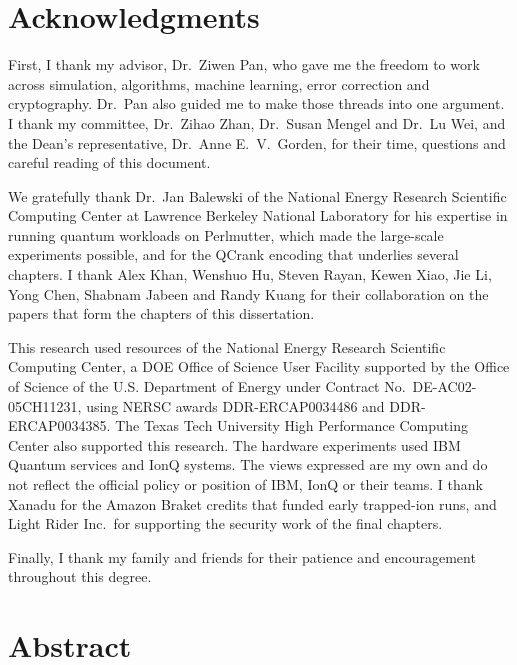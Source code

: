 \documentclass{report}
\theoremstyle{plain}
\theoremstyle{definition}
\theoremstyle{remark}
\begin{document}
\chapter*{Acknowledgments}

First, I thank my advisor, Dr.~Ziwen Pan, who gave me the freedom to work across simulation, algorithms, machine learning, error correction and cryptography. Dr.~Pan also guided me to make those threads into one argument. I thank my committee, Dr.~Zihao Zhan, Dr.~Susan Mengel and Dr.~Lu Wei, and the Dean's representative, Dr.~Anne E.~V.~Gorden, for their time, questions and careful reading of this document.

We gratefully thank Dr.~Jan Balewski of the National Energy Research Scientific Computing Center at Lawrence Berkeley National Laboratory for his expertise in running quantum workloads on Perlmutter, which made the large-scale experiments possible, and for the QCrank encoding that underlies several chapters. I thank Alex Khan, Wenshuo Hu, Steven Rayan, Kewen Xiao, Jie Li, Yong Chen, Shabnam Jabeen and Randy Kuang for their collaboration on the papers that form the chapters of this dissertation.

This research used resources of the National Energy Research Scientific Computing Center, a DOE Office of Science User Facility supported by the Office of Science of the U.S. Department of Energy under Contract No.~DE-AC02-05CH11231, using NERSC awards DDR-ERCAP0034486 and DDR-ERCAP0034385. The Texas Tech University High Performance Computing Center also supported this research. The hardware experiments used IBM Quantum services and IonQ systems. The views expressed are my own and do not reflect the official policy or position of IBM, IonQ or their teams. I thank Xanadu for the Amazon Braket credits that funded early trapped-ion runs, and Light Rider Inc.\ for supporting the security work of the final chapters.

Finally, I thank my family and friends for their patience and encouragement throughout this degree.



\chapter*{Abstract}
\end{document}
